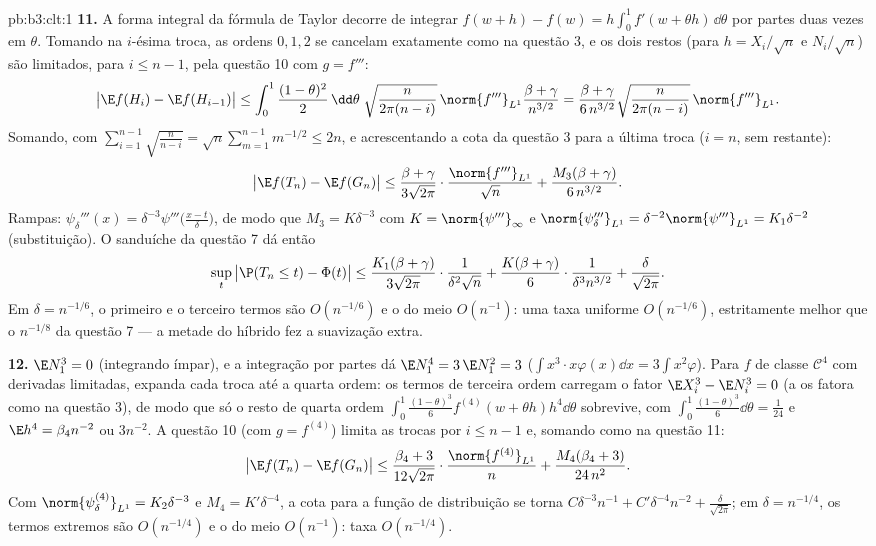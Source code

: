 \begin{solution}{pb:b3:clt:1}
\textbf{11.} A forma integral da fórmula de Taylor decorre
de integrar $f(w + h) - f(w) =
h\int_0^1f'(w + \theta h)\,\dd\theta$ por partes duas vezes em
$\theta$. Tomando  na $i$-ésima troca, as
ordens $0, 1, 2$ se cancelam exatamente como na questão 3, e os
dois restos (para $h = X_i/\sqrt n$
e $N_i/\sqrt n$) são limitados, para $i \leq n - 1$, pela
questão 10 com $g = f'''$:
\[
\bigl|\E f(H_i) - \E f(H_{i-1})\bigr| \leq
\int_0^1\frac{(1-\theta)^2}2\,\dd\theta\;
\sqrt{\frac{n}{2\pi(n-i)}}\,\norm{f'''}_{L^1}
\frac{\beta + \gamma}{n^{3/2}}
= \frac{\beta + \gamma}{6\,n^{3/2}}
\sqrt{\frac{n}{2\pi(n-i)}}\,\norm{f'''}_{L^1} .
\]
Somando, com $\sum_{i=1}^{n-1}\sqrt{\frac n{n-i}} =
\sqrt n\sum_{m=1}^{n-1}m^{-1/2} \leq 2n$, e acrescentando a cota da
questão 3 para a última troca ($i = n$, sem 
restante):
\[
\bigl|\E f(T_n) - \E f(G_n)\bigr| \leq
\frac{\beta + \gamma}{3\sqrt{2\pi}}\cdot
\frac{\norm{f'''}_{L^1}}{\sqrt n} +
\frac{M_3(\beta + \gamma)}{6\,n^{3/2}} .
\]
Rampas: $\psi_\delta'''(x) =
\delta^{-3}\psi'''\bigl(\frac{x - t}\delta\bigr)$, de modo que
$M_3 = K\delta^{-3}$ com $K = \norm{\psi'''}_\infty$ e
$\norm{\psi_\delta'''}_{L^1} = \delta^{-2}
\norm{\psi'''}_{L^1} = K_1\delta^{-2}$ (substituição). O
sanduíche da questão 7 dá então
\[
\sup_t\,\bigl|\P(T_n \leq t) - \Phi(t)\bigr| \leq
\frac{K_1(\beta + \gamma)}{3\sqrt{2\pi}}\cdot
\frac1{\delta^2\sqrt n} +
\frac{K(\beta + \gamma)}{6}\cdot
\frac1{\delta^3n^{3/2}} + \frac\delta{\sqrt{2\pi}} .
\]
Em $\delta = n^{-1/6}$, o primeiro e o terceiro termos são
$O(n^{-1/6})$ e o do meio $O(n^{-1})$: uma taxa uniforme
$O(n^{-1/6})$, estritamente melhor que o $n^{-1/8}$ da questão 7 --- a metade  do híbrido fez a
suavização extra.

\textbf{12.} $\E N_1^3 = 0$ (integrando ímpar), e a
integração por partes dá $\E N_1^4 = 3\,\E N_1^2 = 3$
($\int x^3\cdot x\varphi(x)\dd x =
3\int x^2\varphi$). Para $f$ de classe $\mathcal C^4$ com
derivadas limitadas, expanda cada troca até a quarta ordem: os
termos de terceira ordem carregam o fator $\E X_i^3 - \E N_i^3 =
0$ (a  os fatora como na questão 3), de modo que só
o resto de quarta ordem
$\int_0^1\frac{(1-\theta)^3}6f^{(4)}(w + \theta
h)h^4\dd\theta$ sobrevive, com $\int_0^1
\frac{(1-\theta)^3}6\dd\theta = \frac1{24}$ e $\E h^4 =
\beta_4n^{-2}$ ou $3n^{-2}$. A questão 10 (com $g =
f^{(4)}$) limita as trocas por $i \leq n - 1$ e, somando como
na questão 11:
\[
\bigl|\E f(T_n) - \E f(G_n)\bigr| \leq
\frac{\beta_4 + 3}{12\sqrt{2\pi}}\cdot
\frac{\norm{f^{(4)}}_{L^1}}{n} +
\frac{M_4(\beta_4 + 3)}{24\,n^2} .
\]
Com $\norm{\psi_\delta^{(4)}}_{L^1} = K_2\delta^{-3}$ e
$M_4 = K'\delta^{-4}$, a cota para a função de distribuição
se torna $C\delta^{-3}n^{-1} + C'\delta^{-4}n^{-2} +
\frac\delta{\sqrt{2\pi}}$; em $\delta = n^{-1/4}$, os
termos extremos são $O(n^{-1/4})$ e o do meio $O(n^{-1})$:
taxa $O(n^{-1/4})$.


\end{solution}
